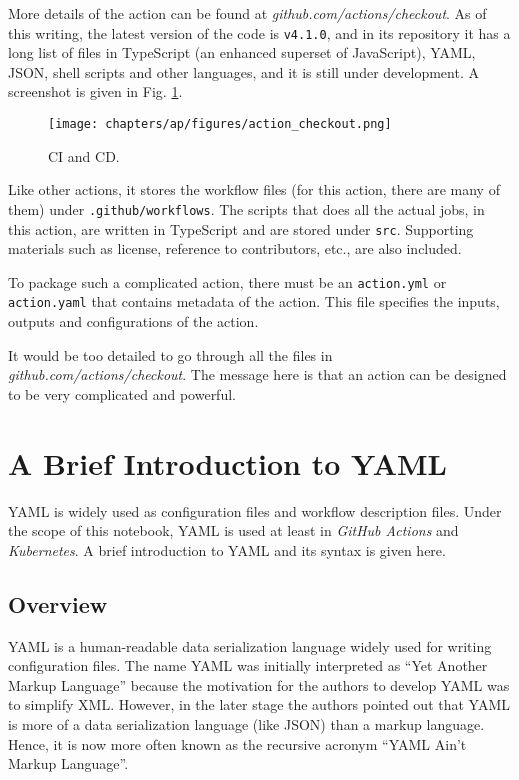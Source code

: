 More details of the action can be found at \textit{github.com/actions/checkout}. As of this writing, the latest version of the code is \verb|v4.1.0|, and in its repository it has a long list of files in TypeScript (an enhanced superset of JavaScript), YAML, JSON, shell scripts and other languages, and it is still under development. A screenshot is given in Fig. \ref{ch:cicd:fig:actioncheckout}.
\begin{figure}[htbp]
	\centering
	\texttt{[image: chapters/ap/figures/action\_checkout.png]}
	\caption{CI and CD.} \label{ch:cicd:fig:actioncheckout}
\end{figure}
Like other actions, it stores the workflow files (for this action, there are many of them) under \verb|.github/workflows|. The scripts that does all the actual jobs, in this action, are written in TypeScript and are stored under \verb|src|. Supporting materials such as license, reference to contributors, etc., are also included.

To package such a complicated action, there must be an \verb|action.yml| or \verb|action.yaml| that contains metadata of the action. This file specifies the inputs, outputs and configurations of the action.

It would be too detailed to go through all the files in \textit{github.com/actions/checkout}. The message here is that an action can be designed to be very complicated and powerful.

\chapter{A Brief Introduction to YAML} \label{ch:yaml}

YAML is widely used as configuration files and workflow description files. Under the scope of this notebook, YAML is used at least in \textit{GitHub Actions} and \textit{Kubernetes}. A brief introduction to YAML and its syntax is given here.

\section{Overview}

YAML is a human-readable data serialization language widely used for writing configuration files. The name YAML was initially interpreted as ``Yet Another Markup Language'' because the motivation for the authors to develop YAML was to simplify XML. However, in the later stage the authors pointed out that YAML is more of a data serialization language (like JSON) than a markup language. Hence, it is now more often known as the recursive acronym ``YAML Ain't Markup Language''.


